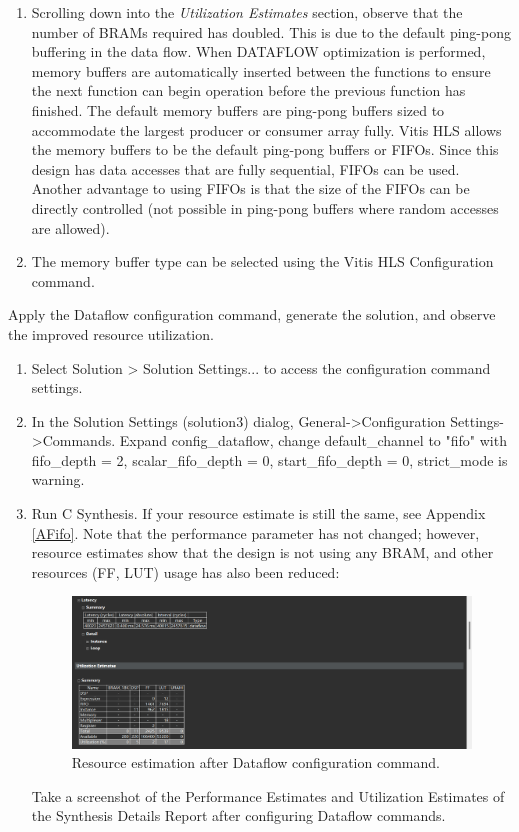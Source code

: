 \documentclass[a4paper,12pt,twoside]{article}
\begin{document}
\begin{enumerate}
    \item Scrolling down into the \textit{Utilization Estimates} section, observe that the number of BRAMs required has doubled. This is due to the default ping-pong buffering in the data flow. When DATAFLOW optimization is performed, memory buffers are automatically inserted between the functions to ensure the next function can begin operation before the previous function has finished. The default memory buffers are ping-pong buffers sized to accommodate the largest producer or consumer array fully. Vitis HLS allows the memory buffers to be the default ping-pong buffers or FIFOs. Since this design has data accesses that are fully sequential, FIFOs can be used. Another advantage to using FIFOs is that the size of the FIFOs can be directly controlled (not possible in ping-pong buffers where random accesses are allowed).
    \item The memory buffer type can be selected using the Vitis HLS Configuration command.
\end{enumerate}
Apply the Dataflow configuration command, generate the solution, and observe the improved resource utilization.
\begin{enumerate}
    \item Select Solution > Solution Settings... to access the configuration command settings.
    \item In the Solution Settings (solution3) dialog, General->Configuration Settings->Commands. Expand config\_dataflow, change default\_channel to "fifo" with fifo\_depth = 2, scalar\_fifo\_depth = 0, start\_fifo\_depth = 0, strict\_mode is warning.
    \item Run C Synthesis. If your resource estimate is still the same, see Appendix \ref{AFifo}. Note that the performance parameter has not changed; however, resource estimates show that the design is not using any BRAM, and other resources (FF, LUT) usage has also been reduced:
    \begin{figure}[H]
        \centering
        \includegraphics[width=\textwidth]{images/9.png}
        \caption{Resource estimation after Dataflow configuration command.}
    \end{figure}
    Take a screenshot of the Performance Estimates and Utilization Estimates of the Synthesis Details Report after configuring Dataflow commands.
\end{enumerate}
\end{document}

